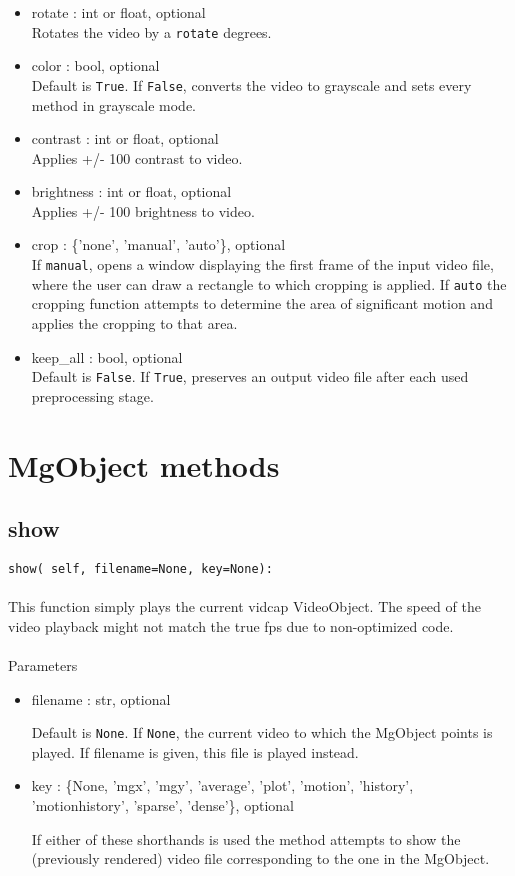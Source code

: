 \documentclass[9pt]{extarticle}
\def\code#1{\texttt{#1}}
\begin{document}
\begin{itemize}
\item rotate : int or float, optional\\
Rotates the video by a \code{rotate} degrees.

\item color : bool, optional\\
Default is \code{True}. If \code{False}, converts the video to grayscale 
and sets every method in grayscale mode.

\item contrast : int or float, optional\\
Applies +/- 100 contrast to video.

\item brightness : int or float, optional\\
Applies +/- 100 brightness to video.

\item crop : \{'none', 'manual', 'auto'\}, optional\\
If \code{manual}, opens a window displaying the first frame of the 
input video file, where the user can draw a rectangle to which 
cropping is applied. If \code{auto} the cropping function attempts to 
determine the area of significant motion and applies the cropping 
to that area.

\item keep\_all : bool, optional\\
Default is \code{False}. If \code{True}, preserves an output video file 
after each used preprocessing stage.

\end{itemize}


\section{MgObject methods}


\subsection{show}

\code{show(
    self, 
    filename=None, 
    key=None):}
\\\\
This function simply plays the current vidcap VideoObject. 
The speed of the video playback might not match the true fps 
due to non-optimized code. 
\\\\

\noindent Parameters
\begin{itemize}
\item filename : str, optional

Default is \code{None}. If \code{None}, the current video to which 
the MgObject points is played. If filename is given, this file is 
played instead. 
\item key : \{None, 'mgx', 'mgy', 'average', 'plot', 'motion', 'history', 'motionhistory', 'sparse', 'dense'\}, optional

If either of these shorthands is used the method attempts to show the 
(previously rendered) video file corresponding to the one in the MgObject.
\end{itemize}
\end{document}

